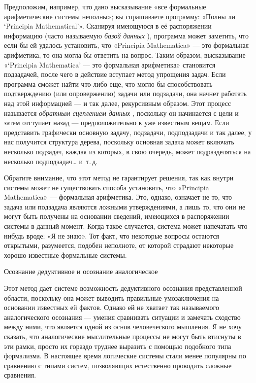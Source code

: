 \documentclass[../main.tex]{subfiles}
\begin{document}
Предположим, например, что дано высказывание «все формальные арифметические системы неполны»; вы спрашиваете программу: «Полны ли \enquote*{Principia Mathematical}». Сканируя имеющуюся в её распоряжении информацию (часто называемую \emph{базой данных} ), программа может заметить, что если бы ей удалось установить, что «Principia Mathematica» --- это формальная арифметика, то она могла бы ответить на вопрос. Таким образом, высказывание «\enquote*{Principia Mathematica} --- это формальная арифметика» становится подзадачей, после чего в действие вступает метод упрощения задач. Если программа сможет найти что-либо еще, что могло бы способствовать подтверждению (или опровержению) задачи или подзадачи, она начнет работать над этой информацией --- и так далее, рекурсивным образом. Этот процесс называется \emph{обратным сцеплением данных} , поскольку он начинается с цели и затем отступает назад --- предположительно к уже известным вещам. Если представить графически основную задачу, подзадачи, подподзадачи и так далее, у нас получится структура дерева, поскольку основная задача может включать несколько подзадач, каждая из которых, в свою очередь, может подразделяться на несколько подподзадач\ldots{} и~т.\,д.

Обратите внимание, что этот метод не гарантирует решения, так как внутри системы может не существовать способа установить, что «Principia Mathematica» --- формальная арифметика. Это, однако, означает не то, что задача или подзадача являются ложными утверждениями, а лишь то, что они не могут быть получены на основании сведений, имеющихся в распоряжении системы в данный момент. Когда такое случается, система может напечатать что-нибудь вроде: «Я не знаю». Тот факт, что некоторые вопросы остаются открытыми, разумеется, подобен неполноте, от которой страдают некоторые хорошо известные формальные системы.

Осознание дедуктивное и осознание аналогическое

Этот метод дает системе возможность дедуктивного осознания представленной области, поскольку она может выводить правильные умозаключения на основании известных ей фактов. Однако ей не хватает так называемого аналогического осознания --- умения сравнивать ситуации и замечать сходство между ними, что является одной из основ человеческого мышления. Я не хочу сказать, что аналогические мыслительные процессы не могут быть втиснуты в эти рамки, просто их гораздо труднее выразить с помощью подобного типа формализма. В настоящее время логические системы стали менее популярны по сравнению с типами систем, позволяющих естественно проводить сложные сравнения.
\end{document}
